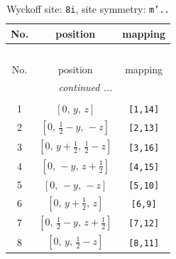 \documentclass[fleqn,8pt]{jsarticle}
\begin{document}
\begin{longtable}{ccc}
\caption{Wyckoff site: {\tt 8i}, site symmetry: {\tt m'..}}
 \\
 \hline \hline
No. & position & mapping \\ \hline \endfirsthead

\multicolumn{2}{l}{\tablename\ \thetable{}} \\
 \hline \hline
No. & position & mapping \\ \hline \endhead

 \hline \hline
\multicolumn{2}{r}{\footnotesize\it continued ...} \\ \endfoot

 \hline \hline
\multicolumn{2}{r}{} \\ \endlastfoot

1 & $\left[ 0,\, y,\, z \right]$ & {\tt [1,14]} \\ \hline
2 & $\left[ 0,\, \frac{1}{2} - y,\, - z \right]$ & {\tt [2,13]} \\ \hline
3 & $\left[ 0,\, y + \frac{1}{2},\, \frac{1}{2} - z \right]$ & {\tt [3,16]} \\ \hline
4 & $\left[ 0,\, - y,\, z + \frac{1}{2} \right]$ & {\tt [4,15]} \\ \hline
5 & $\left[ 0,\, - y,\, - z \right]$ & {\tt [5,10]} \\ \hline
6 & $\left[ 0,\, y + \frac{1}{2},\, z \right]$ & {\tt [6,9]} \\ \hline
7 & $\left[ 0,\, \frac{1}{2} - y,\, z + \frac{1}{2} \right]$ & {\tt [7,12]} \\ \hline
8 & $\left[ 0,\, y,\, \frac{1}{2} - z \right]$ & {\tt [8,11]} \\
\end{longtable}
\renewcommand{\arraystretch}{1.2}
\end{document}
